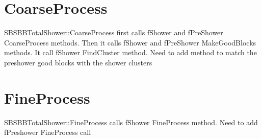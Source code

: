 \documentclass[11pt]{article}
\begin{document}
\section{CoarseProcess}
SBSBBTotalShower::CoarseProcess first calls fShower and fPreShower CoarseProcess methods.
Then it calls  fShower and fPreShower MakeGoodBlocks methods.
It call fShower FindCluster method. {\color{red} Need to add method to match the preshower good blocks
with the shower clusters}

\section{FineProcess}
SBSBBTotalShower::FineProcess calls fShower FineProcess method.
{\color{red} Need to add fPreshower FineProcess call}
\end{document}
